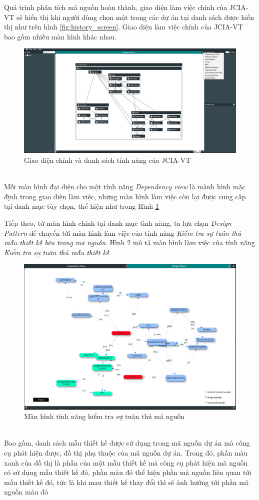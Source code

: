 \documentclass[12pt]{report}
\begin{document}
Quá trình phân tích mã nguồn hoàn thành, giao diện làm việc chính của JCIA-VT sẽ hiển thị khi người dùng chọn một trong các dự án tại danh sách được hiển thị như trên hình \ref{fig:history_screen}. Giao diện làm việc chính của JCIA-VT bao gồm nhiều màn hình khác nhau.
\begin{figure}[h]
	\centering
	\includegraphics[scale=0.25]{images/main_screen}
	\caption{Giao diện chính và danh sách tính năng của JCIA-VT}
	\label{fig:main_screen}
\end{figure}\\
Mỗi màn hình đại diện cho một tính năng \textit{Dependency view} là mành hình mặc định trong giao diện làm việc, những màn hình làm việc còn lại được cung cấp tại danh mục tùy chọn, thể hiện như trong Hình \ref{fig:main_screen}

\noindent Tiếp theo, từ màn hình chính tại danh mục tình năng, ta lựa chọn \textit{Design Pattern} để chuyển tới màn hình làm việc của tính năng \textit{Kiểm tra sự tuân thủ mẫu thiết kế bên trong mã nguồn}. Hình \ref{fig:design_pattern_workspace} mô tả màn hình làm việc của tính năng \textit{Kiểm tra sự tuân thủ mẫu thiết kế}
\begin{figure}[h]
	\centering
	\includegraphics[scale=0.34]{images/design_pattern_workspace}
	\caption{Màn hình tính năng kiểm tra sự tuân thủ mã nguồn}
	\label{fig:design_pattern_workspace}
\end{figure}\\
Bao gồm, danh sách mẫu thiết kế được sử dụng trong mã nguồn dự án mà công cụ phát hiện được, đồ thị phụ thuộc của mã nguồn dự án. Trong đó, phần màu xanh của đồ thị là phần của một mẫu thiết kế mà công cụ phát hiện mã nguồn có sử dụng mẫu thiết kế đó, phần màu đỏ thể hiện phần mã nguồn liên quan tới mẫu thiết kế đó, tức là khi mau thiết kế thay đổi thì sẽ ảnh hưởng tới phần mã nguồn màu đỏ
\end{document}

